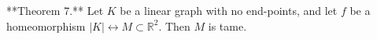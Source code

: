 **Theorem 7.** Let $K$ be a linear graph with no end-points, and let $f$ be a homeomorphism $|K| \leftrightarrow M \subset \mathbb{R}^2$. Then $M$ is tame.
